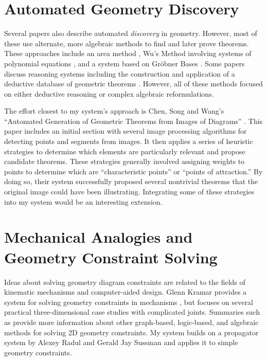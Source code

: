 \section{Automated Geometry Discovery}
Several papers also describe automated \emph{discovery} in
geometry. However, most of these use alternate, more algebraic methods
to find and later prove theorems.  These approaches include an area
method \cite{autoTools}, Wu's Method involving systems of polynomial
equations \cite{wuMethod}, and a system based on Gr\"obner Bases
\cite{grobner}.  Some papers discuss reasoning systems including the
construction and application of a deductive database of geometric
theorems \cite{deductiveDatabase}.  However, all of these methods
focused on either deductive reasoning or complex algebraic
reformulations.

The effort closest to my system's approach is Chen, Song and Wang's
``Automated Generation of Geometric Theorems from Images of Diagrams''
\cite{fromImages}. This paper includes an initial section with several
image processing algorithms for detecting points and segments from
images. It then applies a series of heuristic strategies to determine
which elements are particularly relevant and propose candidate
theorems. These strategies generally involved assigning weights to
points to determine which are ``characteristic points'' or ``points of
attraction.'' By doing so, their system successfully proposed several
nontrivial theorems that the original image could have been
illustrating.  Integrating some of these strategies into my system
would be an interesting extension.

\section{Mechanical Analogies and Geometry Constraint Solving}

Ideas about solving geometry diagram constraints are related to the
fields of kinematic mechanisms and computer-aided design. Glenn
Kramar provides a system for solving geometry constraints in
mechanisms \cite{kramer1992solving}, but focuses on several practical
three-dimensional case studies with complicated joints. Summaries such
as \cite{joan2009basics} provide more information about other
graph-based, logic-based, and algebraic methods for solving 2D
geometry constraints. My system builds on a propagator system by
Alexey Radul and Gerald Jay Sussman \cite{radul-propagator} and
applies it to simple geometry constraints.

